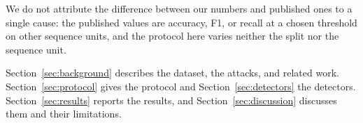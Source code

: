 We do not attribute the difference between our numbers and published ones to a single cause: the published values
are accuracy, F1, or recall at a chosen threshold on other sequence units, and the protocol here varies neither the
split nor the sequence unit.

Section~\ref{sec:background} describes the dataset, the attacks, and related work. Section~\ref{sec:protocol}
gives the protocol and Section~\ref{sec:detectors} the detectors. Section~\ref{sec:results} reports the results,
and Section~\ref{sec:discussion} discusses them and their limitations.
